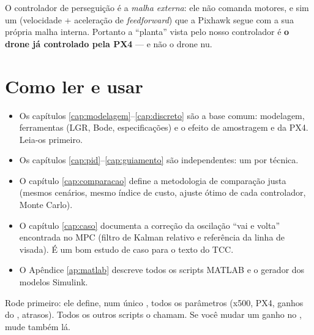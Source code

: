 O controlador de perseguição é a \emph{malha externa}: ele não comanda motores, e sim
um  (velocidade + aceleração de \emph{feedforward}) que a
Pixhawk segue com a sua própria malha interna. Portanto a ``planta'' vista pelo nosso
controlador é \textbf{o drone já controlado pela PX4} --- e não o drone nu.

\section{Como ler e usar}
\begin{itemize}
  \item Os capítulos \ref{cap:modelagem}--\ref{cap:discreto} são a base comum: modelagem,
        ferramentas (LGR, Bode, especificações) e o efeito de amostragem e da PX4.
        Leia-os primeiro.
  \item Os capítulos \ref{cap:pid}--\ref{cap:guiamento} são independentes: um por técnica.
  \item O capítulo \ref{cap:comparacao} define a metodologia de comparação justa (mesmos
        cenários, mesmo índice de custo, ajuste ótimo de cada controlador, Monte Carlo).
  \item O capítulo \ref{cap:caso} documenta a correção da oscilação ``vai e volta''
        encontrada no MPC (filtro de Kalman relativo e referência da linha de visada).
        É um bom estudo de caso para o texto do TCC.
  \item O Apêndice \ref{ap:matlab} descreve todos os scripts MATLAB e o gerador dos
        modelos Simulink.
\end{itemize}

\begin{dica}
Rode  primeiro: ele define, num único , todos os
parâmetros (x500, PX4, ganhos do , atrasos). Todos os outros scripts o
chamam. Se você mudar um ganho no , mude também lá.
\end{dica}
